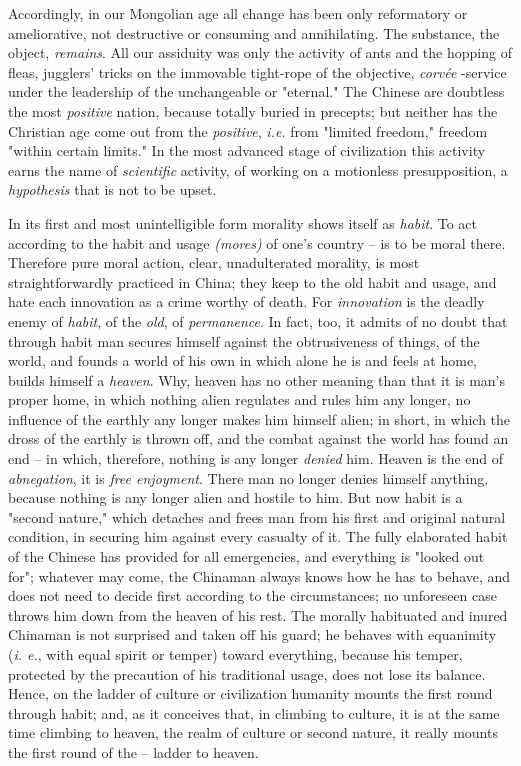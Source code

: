 Accordingly, in our Mongolian age all change has been only reformatory or 
ameliorative, not destructive or consuming and annihilating. The substance, 
the object, \textit{remains}. All our assiduity was only the activity of ants 
and the hopping of fleas, jugglers' tricks on the immovable tight-rope of the 
objective, \textit{corv\'ee} -service under the leadership of the unchangeable 
or "{}eternal."{} The Chinese are doubtless the most \textit{positive} nation, 
because totally buried in precepts; but neither has the Christian age come out 
from the \textit{positive}, \textit{i.e.} from "{}limited freedom,"{} freedom 
"{}within certain limits."{} In the most advanced stage of civilization this 
activity earns the name of \textit{scientific} activity, of working on a 
motionless presupposition, a \textit{hypothesis} that is not to be upset.

In its first and most unintelligible form morality shows itself as 
\textit{habit}. To act according to the habit and usage \textit{(mores)} of 
one's country -- is to be moral there. Therefore pure moral action, clear, 
unadulterated morality, is most straightforwardly practiced in China; they 
keep to the old habit and usage, and hate each innovation as a crime worthy of 
death. For \textit{innovation} is the deadly enemy of \textit{habit}, of the 
\textit{old}, of \textit{permanence}. In fact, too, it admits of no doubt that 
through habit man secures himself against the obtrusiveness of things, of the 
world, and founds a world of his own in which alone he is and feels at home, 
builds himself a \textit{heaven}. Why, heaven has no other meaning than that 
it is man's proper home, in which nothing alien regulates and rules him any 
longer, no influence of the earthly any longer makes him himself alien; in 
short, in which the dross of the earthly is thrown off, and the combat against 
the world has found an end -- in which, therefore, nothing is any longer 
\textit{denied} him. Heaven is the end of \textit{abnegation}, it is 
\textit{free enjoyment}. There man no longer denies himself anything, because 
nothing is any longer alien and hostile to him. But now habit is a "{}second 
nature,"{} which detaches and frees man from his first and original natural 
condition, in securing him against every casualty of it. The fully elaborated 
habit of the Chinese has provided for all emergencies, and everything is 
"{}looked out for"{}; whatever may come, the Chinaman always knows how he has 
to behave, and does not need to decide first according to the circumstances; 
no unforeseen case throws him down from the heaven of his rest. The morally 
habituated and inured Chinaman is not surprised and taken off his guard; he 
behaves with equanimity (\textit{i. e.}, with equal spirit or temper) toward 
everything, because his temper, protected by the precaution of his traditional 
usage, does not lose its balance. Hence, on the ladder of culture or 
civilization humanity mounts the first round through habit; and, as it 
conceives that, in climbing to culture, it is at the same time climbing to 
heaven, the realm of culture or second nature, it really mounts the first 
round of the -- ladder to heaven.


